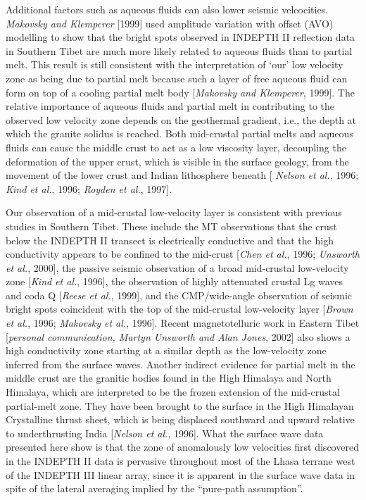 \documentclass[12pt]{article}
\begin{document}
Additional factors such as aqueous fluids can also lower seismic velcocities.
{\it Makovsky and Klemperer} [1999] used amplitude variation with
offset (AVO) modelling to show that
the bright spots observed in INDEPTH II reflection data in
Southern Tibet are much more likely related to aqueous fluids than to
partial melt.  This result is still consistent with the
interpretation of `our' low velocity zone as being due to partial
melt because such a layer of free aqueous fluid can form on top of a
cooling partial melt body [{\it Makovsky and Klemperer}, 1999].  The
relative importance of aqueous fluids and partial melt in contributing 
to the observed low velocity zone depends on the geothermal gradient,
i.e., the depth at which the granite solidus is reached.
Both mid-crustal partial melts and
aqueous fluids can cause the middle crust to act as a low viscosity
layer, decoupling the deformation of the upper  
crust, which is visible in the surface geology, from the movement of
the lower crust and Indian lithosphere beneath [{\it 
Nelson et al.}, 1996; {\it Kind et al.}, 1996; {\it Royden et al.}, 1997]. 

Our observation of a mid-crustal low-velocity layer is consistent with previous 
studies in Southern Tibet.    These include the MT observations that the crust 
below the INDEPTH II transect is electrically conductive and that the high conductivity appears to be 
confined to the mid-crust [{\it Chen et al.}, 1996; {\it Unsworth et al.}, 2000], the passive seismic 
observation of a broad mid-crustal low-velocity zone [{\it Kind et al.}, 1996], the observation of highly 
attenuated crustal Lg waves and coda Q [{\it Reese et al.}, 1999], and the CMP/wide-angle observation of 
seismic bright spots coincident with the top of the mid-crustal low-velocity layer [{\it Brown et al.}, 
1996; {\it Makovsky et al.}, 1996].  Recent magnetotelluric work in Eastern Tibet [{\it personal communication, 
Martyn Unsworth and Alan Jones}, 2002] also shows a high conductivity zone starting at a similar depth as 
the low-velocity zone inferred from the surface waves.  
Another indirect evidence for partial melt in the 
middle crust are the granitic bodies  
found in the High Himalaya and North Himalaya, which are
interpreted to be the frozen extension of the mid-crustal partial-melt 
zone. They have been brought to the surface  in the  High Himalayan Crystalline thrust
sheet, which is being displaced southward and upward relative to
underthrusting India [{\it Nelson et al.}, 1996].  
What the
surface wave data presented here show is that the zone of anomalously
low velocities first discovered in the INDEPTH II data is
pervasive throughout most of the Lhasa terrane west of the INDEPTH III
linear array, since it is apparent in the surface wave data in spite
of the lateral averaging implied by the ``pure-path assumption''.
\end{document}
